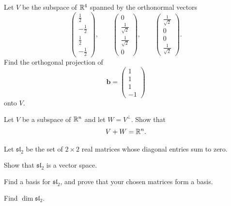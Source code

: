\begin{problem}
Let $V$ be the subspace of $\mathbb{R}^4$ spanned by the orthonormal vectors
\[
\begin{pmatrix}\frac12\\-\frac12\\\frac12\\-\frac12\end{pmatrix},
\qquad
\begin{pmatrix}0\\\frac1{\sqrt2}\\\frac1{\sqrt2}\\0\end{pmatrix},
\qquad
\begin{pmatrix}\frac1{\sqrt2}\\0\\0\\\frac1{\sqrt2}\end{pmatrix}.
\]
Find the orthogonal projection of
\[
\mathbf b=
\begin{pmatrix}
1\\1\\1\\-1
\end{pmatrix}
\]
onto $V$.
\end{problem}

\begin{problem}
Let $V$ be a subspace of $\mathbb{R}^n$ and let $W=V^\perp$. Show that
\[
V+W=\mathbb{R}^n.
\]
\end{problem}

\begin{problem}
Let $\mathfrak{sl}_2$ be the set of $2\times2$ real matrices whose diagonal entries sum to zero.
\begin{problemsubparts}
\item Show that $\mathfrak{sl}_2$ is a vector space.
\item Find a basis for $\mathfrak{sl}_2$, and prove that your chosen matrices form a basis.
\item Find $\dim\mathfrak{sl}_2$.
\end{problemsubparts}
\end{problem}

